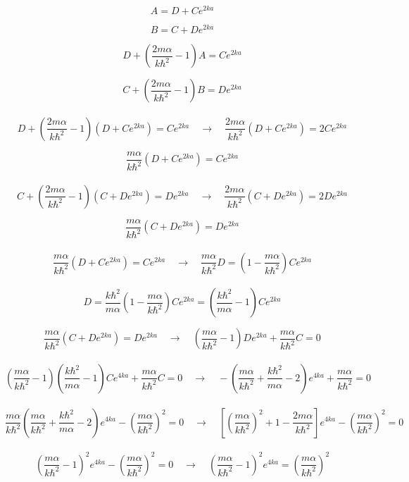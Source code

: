 \documentclass[10pt,a4papper]{article}
\begin{document}
\[A=D+Ce^{2ka}\]

\[B=C+De^{2ka}\]

\[D+\left(\frac{2m\alpha}{k\hbar^2}-1\right)A=Ce^{2ka}\]

\[C+\left(\frac{2m\alpha}{k\hbar^2}-1\right)B=De^{2ka}\]\\

\[D+\left(\frac{2m\alpha}{k\hbar^2}-1\right)\left(D+Ce^{2ka}\right)=Ce^{2ka}\quad\to\quad
\frac{2m\alpha}{k\hbar^2}\left(D+Ce^{2ka}\right)=2Ce^{2ka}\]

\[\boxed{\frac{m\alpha}{k\hbar^2}\left(D+Ce^{2ka}\right)=Ce^{2ka}}\]\\

\[C+\left(\frac{2m\alpha}{k\hbar^2}-1\right)\left(C+De^{2ka}\right)=De^{2ka}\quad\to\quad
\frac{2m\alpha}{k\hbar^2}\left(C+De^{2ka}\right)=2De^{2ka}\]

\[\boxed{\frac{m\alpha}{k\hbar^2}\left(C+De^{2ka}\right)=De^{2ka}}\]\\

\[\frac{m\alpha}{k\hbar^2}\left(D+Ce^{2ka}\right)=Ce^{2ka}\quad\to\quad
\frac{m\alpha}{k\hbar^2}D=\left(1-\frac{m\alpha}{k\hbar^2}\right)Ce^{2ka}\]\\

\[D=\frac{k\hbar^2}{m\alpha}\left(1-\frac{m\alpha}{k\hbar^2}\right)Ce^{2ka}=
\left(\frac{k\hbar^2}{m\alpha}-1\right)Ce^{2ka}\]

\newpage
\[\frac{m\alpha}{k\hbar^2}\left(C+De^{2ka}\right)=De^{2ka}\quad\to\quad
\left(\frac{m\alpha}{k\hbar^2}-1\right)De^{2ka}+\frac{m\alpha}{k\hbar^2}C=0\]\\

\[\left(\frac{m\alpha}{k\hbar^2}-1\right)\left(\frac{k\hbar^2}{m\alpha}-1\right)Ce^{4ka}+\frac{m\alpha}{k\hbar^2}C=0\quad\to\quad
-\left(\frac{m\alpha}{k\hbar^2}+\frac{k\hbar^2}{m\alpha}-2\right)e^{4ka}+\frac{m\alpha}{k\hbar^2}=0\]\\

\[\frac{m\alpha}{k\hbar^2}\left(\frac{m\alpha}{k\hbar^2}+\frac{k\hbar^2}{m\alpha}-2\right)e^{4ka}-\left(\frac{m\alpha}{k\hbar^2}\right)^2=0\quad\to\quad
\left[\left(\frac{m\alpha}{k\hbar^2}\right)^2+1-\frac{2m\alpha}{k\hbar^2}\right]e^{4ka}-\left(\frac{m\alpha}{k\hbar^2}\right)^2=0\]\\

\[\left(\frac{m\alpha}{k\hbar^2}-1\right)^2e^{4ka}-\left(\frac{m\alpha}{k\hbar^2}\right)^2=0\quad\to\quad
\left(\frac{m\alpha}{k\hbar^2}-1\right)^2e^{4ka}=\left(\frac{m\alpha}{k\hbar^2}\right)^2\]\\
\end{document}
